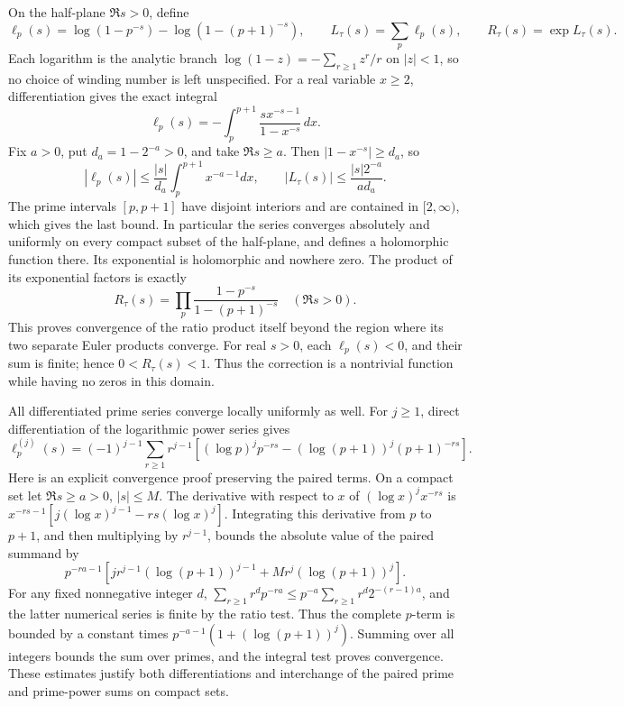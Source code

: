 \documentclass[
  10pt,
]{article}
\begin{document}
On the half-plane \(\Re s>0\), define \[
\ell_p(s)=\log(1-p^{-s})-\log(1-(p+1)^{-s}),
\qquad L_\tau(s)=\sum_p\ell_p(s),\qquad R_\tau(s)=\exp L_\tau(s).
\tag{TPS26}
\] Each logarithm is the analytic branch
\(\log(1-z)=-\sum_{r\ge1}z^r/r\) on \(|z|<1\), so no choice of winding
number is left unspecified. For a real variable \(x\ge2\),
differentiation gives the exact integral \[
\ell_p(s)=-\int_p^{p+1}\frac{s x^{-s-1}}{1-x^{-s}}\,dx.
\tag{TPS27}
\] Fix \(a>0\), put \(d_a=1-2^{-a}>0\), and take \(\Re s\ge a\). Then
\(|1-x^{-s}|\ge d_a\), so \[
|\ell_p(s)|\le\frac{|s|}{d_a}\int_p^{p+1}x^{-a-1}dx,
\qquad
|L_\tau(s)|\le\frac{|s|2^{-a}}{a d_a}.
\tag{TPS28}
\] The prime intervals \([p,p+1]\) have disjoint interiors and are
contained in \([2,\infty)\), which gives the last bound. In particular
the series converges absolutely and uniformly on every compact subset of
the half-plane, and defines a holomorphic function there. Its
exponential is holomorphic and nowhere zero. The product of its
exponential factors is exactly \[
\boxed{R_\tau(s)=\prod_p\frac{1-p^{-s}}{1-(p+1)^{-s}}
\quad(\Re s>0).}
\tag{TPS29}
\] This proves convergence of the ratio product itself beyond the region
where its two separate Euler products converge. For real \(s>0\), each
\(\ell_p(s)<0\), and their sum is finite; hence \(0<R_\tau(s)<1\). Thus
the correction is a nontrivial function while having no zeros in this
domain.

All differentiated prime series converge locally uniformly as well. For
\(j\ge1\), direct differentiation of the logarithmic power series gives
\[
\ell_p^{(j)}(s)=(-1)^{j-1}\sum_{r\ge1}r^{j-1}
\left[(\log p)^j p^{-rs}-(\log(p+1))^j(p+1)^{-rs}\right].
\tag{TPS30}
\] Here is an explicit convergence proof preserving the paired terms. On
a compact set let \(\Re s\ge a>0\), \(|s|\le M\). The derivative with
respect to \(x\) of \((\log x)^j x^{-rs}\) is
\(x^{-rs-1}[j(\log x)^{j-1}-rs(\log x)^j]\). Integrating this derivative
from \(p\) to \(p+1\), and then multiplying by \(r^{j-1}\), bounds the
absolute value of the paired summand by \[
p^{-ra-1}\left[jr^{j-1}(\log(p+1))^{j-1}
+Mr^j(\log(p+1))^j\right].
\] For any fixed nonnegative integer \(d\),
\(\sum_{r\ge1}r^d p^{-ra}\le p^{-a}\sum_{r\ge1}r^d2^{-(r-1)a}\), and the
latter numerical series is finite by the ratio test. Thus the complete
\(p\)-term is bounded by a constant times \(p^{-a-1}(1+(\log(p+1))^j)\).
Summing over all integers bounds the sum over primes, and the integral
test proves convergence. These estimates justify both differentiations
and interchange of the paired prime and prime-power sums on compact
sets.
\end{document}
